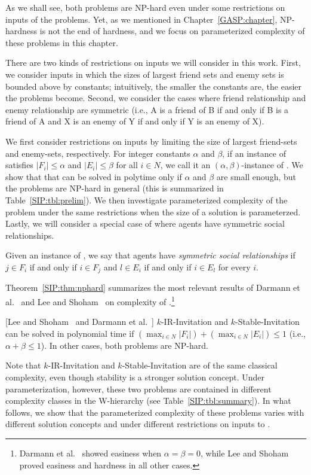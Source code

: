 As we shall see, both problems are NP-hard even under some restrictions on inputs of the problems. Yet, as we mentioned in Chapter~\ref{GASP:chapter}, NP-hardness is not the end of hardness, and we focus on parameterized complexity of these problems in this chapter. 

There are two kinds of restrictions on inputs we will consider in this work.
First, we consider inputs in which the sizes of largest friend sets and enemy sets is bounded above by constants; intuitively, the smaller the constants are, the easier the problems become. Second, we consider the cases where friend relationship and enemy relationship are symmetric (i.e., A is a friend of B if and only if B is a friend of A and X is an enemy of Y if and only if Y is an enemy of X). 

We first consider restrictions on inputs by limiting the size of largest friend-sets and enemy-sets, respectively. 
For integer constants $\alpha$ and $\beta$, if an instance of \SIPs satisfies $|F_i| \leq \alpha$ and $|E_i| \leq \beta$ for all $i\in N$, we call it an $(\alpha,\beta)$-instance of \SIP.
We show that that \SIPs can be solved in polytime only if $\alpha$ and $\beta$ are small enough, but the problems are NP-hard in general (this is summarized in Table~\ref{SIP:tbl:prelim}).
We then investigate parameterized complexity of the problem under the same restrictions when the size of a solution is parameterzed. 
Lastly, we will consider a special case of \SIPs where agents have symmetric social relationships.
\begin{definition} \label{SIP:def:symmetric_social}
	Given an instance of \SIP, we say that agents have {\em symmetric social relationships} if $j\in F_i$ if and only if $i\in F_j$ and $l \in E_i$ if and only if $i \in E_l$ for every $i$. 
\end{definition}

Theorem~\ref{SIP:thm:nphard} summarizes the most relevant results of Darmann et al.~\cite{GASP12WINE} and Lee and Shoham~\cite{LEE15AAAI} on complexity of \SIPs.\footnote{
Darmann et al.~\cite{GASP12WINE} showed easiness when $\alpha=\beta=0$, while Lee and Shoham~\cite{LEE15AAAI} proved easiness and hardness in all other cases.}
\begin{theorem} \label{SIP:thm:nphard} [Lee and Shoham~\cite{LEE15AAAI} and Darmann et al.~\cite{GASP12WINE}]
	$k$-IR-Invitation and $k$-Stable-Invitation can be solved in polynomial time if $(\max_{i \in N} |F_i|) + (\max_{i \in N} |E_i|) \leq 1$ (i.e., $\alpha + \beta \leq 1$). In other cases, both problems are NP-hard.
\end{theorem}
Note that $k$-IR-Invitation and $k$-Stable-Invitation are of the same classical complexity, even though stability is a stronger solution concept. Under parameterization, however, these two problems are contained in different complexity classes in the W-hierarchy (see Table~\ref{SIP:tbl:summary}).
In what follows, we show that the parameterized complexity of these problems varies with different solution concepts and under different restrictions on inputs to \SIP.


